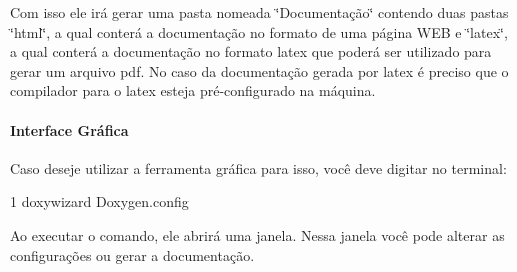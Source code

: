 Com isso ele irá gerar uma pasta nomeada \char`\"{}\+Documentação\char`\"{} contendo duas pastas \char`\"{}html\char`\"{}, a qual conterá a documentação no formato de uma página W\+EB e \char`\"{}latex\char`\"{}, a qual conterá a documentação no formato latex que poderá ser utilizado para gerar um arquivo pdf. No caso da documentação gerada por latex é preciso que o compilador para o latex esteja pré-\/configurado na máquina.

\paragraph*{Interface Gráfica}

Caso deseje utilizar a ferramenta gráfica para isso, você deve digitar no terminal\+:


\begin{DoxyCode}
1 doxywizard Doxygen.config
\end{DoxyCode}


Ao executar o comando, ele abrirá uma janela. Nessa janela você pode alterar as configurações ou gerar a documentação. 